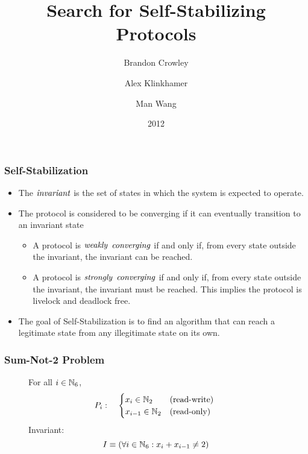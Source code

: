 \documentclass[handout]{beamer}
\title{Search for Self-Stabilizing Protocols}
\author{Brandon Crowley \and Alex Klinkhamer \and Man Wang}
\institute{Michigan Technological University}
\date{2012}
\begin{document}
\setlength{\abovedisplayskip}{0.5em}
\setlength{\abovedisplayshortskip}{0.5em}
\setlength{\belowdisplayskip}{0.5em}
\setlength{\belowdisplayshortskip}{0.5em}
\setlength{\abovecaptionskip}{0.0em}
\setlength{\belowcaptionskip}{0.0em}

\begin{frame}
\titlepage
\end{frame}

\begin{frame}
\frametitle{Self-Stabilization}
\begin{itemize}
\item The $\mathit{invariant}$ is the set of states in which the system is expected to operate.
\item The protocol is considered to be converging if it can eventually transition to an invariant state
 \begin{itemize}
 \item A protocol is $\mathit{weakly}$ $\mathit{converging}$ if and only if, from every state outside the
    invariant, the invariant can be reached\cite{wssGouda01}.
 \item A protocol is $\mathit{strongly}$ $\mathit{converging}$ if and only if, from every state outside the
    invariant, the invariant must be reached.  This implies the protocol is livelock and deadlock
    free\cite{wssGouda01}.
 \end{itemize}
\item The goal of Self-Stabilization is to find an algorithm that can reach a legitimate state from
    any illegitimate state on its own.
\end{itemize}
\end{frame}

\begin{frame}
\frametitle{Sum-Not-2 Problem}
\begin{figure}

\begin{flushleft}
For all $i\in\mathbb{N}_6$,
\begin{eqnarray*}
P_i & : &
 \mbox{
  $\begin{cases}
  x_i\in\mathbb{N}_2 & \mbox{(read-write)} \\
  x_{i-1}\in\mathbb{N}_2 & \mbox{(read-only)} \\
  \end{cases}$
 }
\end{eqnarray*}
Invariant:
\[ I \equiv (\forall i\in\mathbb{N}_6: x_i + x_{i-1} \ne 2) \]
\end{flushleft}
\end{figure}
\end{frame}
\end{document}
